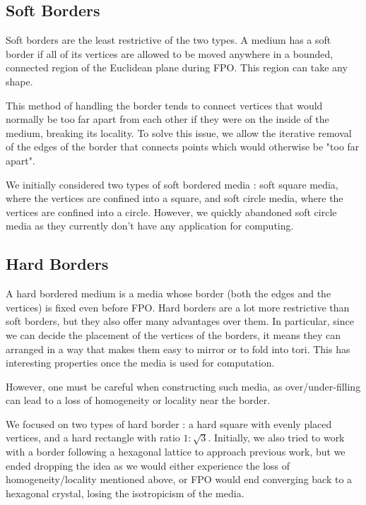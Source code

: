 \documentclass{article}
\begin{document}
\subsection{Soft Borders}

Soft borders are the least restrictive of the two types. A medium has a soft border if all of its vertices are allowed to be moved anywhere in a bounded, connected region of the Euclidean plane during FPO. This region can take any shape.

This method of handling the border tends to connect vertices that would normally be too far apart from each other if they were on the inside of the medium, breaking its locality. To solve this issue, we allow the iterative removal of the edges of the border that connects points which would otherwise be "too far apart".

We initially considered two types of soft bordered media : soft square media, where the vertices are confined into a square, and soft circle media, where the vertices are confined into a circle. However, we quickly abandoned soft circle media as they currently don't have any application for computing.

\subsection{Hard Borders}

A hard bordered medium is a media whose border (both the edges and the vertices) is fixed even before FPO. Hard borders are a lot more restrictive than soft borders, but they also offer many advantages over them. In particular, since we can decide the placement of the vertices of the borders, it means they can arranged in a way that makes them easy to mirror or to fold into tori. This has interesting properties once the media is used for computation.

However, one must be careful when constructing such media, as over/under-filling can lead to a loss of homogeneity or locality near the border.

We focused on two types of hard border : a hard square with evenly placed vertices, and a hard rectangle with ratio $1\colon\sqrt{3}$. Initially, we also tried to work with a border following a hexagonal lattice to approach previous work, but we ended dropping the idea as we would either experience the loss of homogeneity/locality mentioned above, or FPO would end converging back to a hexagonal crystal, losing the isotropicism of the media.
\end{document}
